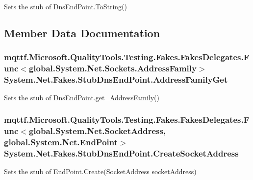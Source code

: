 Sets the stub of Dns\-End\-Point.\-To\-String()



\subsection{Member Data Documentation}
\hypertarget{class_system_1_1_net_1_1_fakes_1_1_stub_dns_end_point_aef88bf8b1a4e422144dd3e6cd5b5196d}{
\subsubsection[{Address\-Family\-Get}]{\setlength{\rightskip}{0pt plus 5cm}mqttf.\-Microsoft.\-Quality\-Tools.\-Testing.\-Fakes.\-Fakes\-Delegates.\-Func$<$global.\-System.\-Net.\-Sockets.\-Address\-Family$>$ System.\-Net.\-Fakes.\-Stub\-Dns\-End\-Point.\-Address\-Family\-Get}}\label{class_system_1_1_net_1_1_fakes_1_1_stub_dns_end_point_aef88bf8b1a4e422144dd3e6cd5b5196d}


Sets the stub of Dns\-End\-Point.\-get\-\_\-\-Address\-Family()

\hypertarget{class_system_1_1_net_1_1_fakes_1_1_stub_dns_end_point_a100a8c8a7f1a4671f4d74d8ff59bd32d}{
\subsubsection[{Create\-Socket\-Address}]{\setlength{\rightskip}{0pt plus 5cm}mqttf.\-Microsoft.\-Quality\-Tools.\-Testing.\-Fakes.\-Fakes\-Delegates.\-Func$<$global.\-System.\-Net.\-Socket\-Address, global.\-System.\-Net.\-End\-Point$>$ System.\-Net.\-Fakes.\-Stub\-Dns\-End\-Point.\-Create\-Socket\-Address}}\label{class_system_1_1_net_1_1_fakes_1_1_stub_dns_end_point_a100a8c8a7f1a4671f4d74d8ff59bd32d}


Sets the stub of End\-Point.\-Create(\-Socket\-Address socket\-Address)

